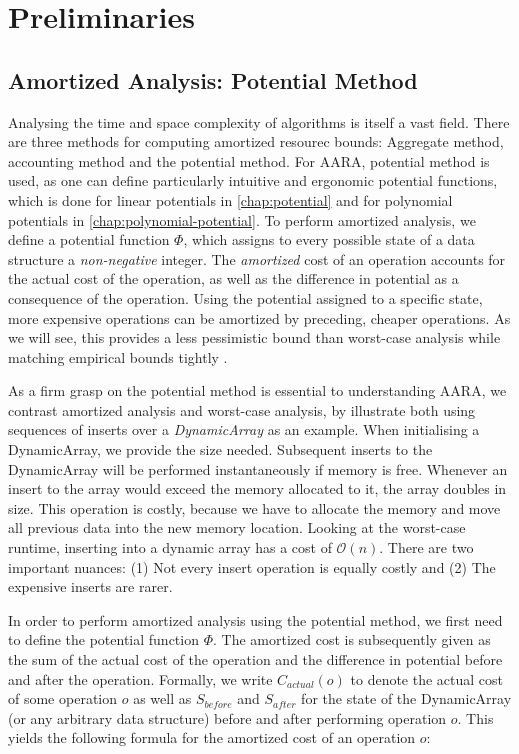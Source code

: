 \chapter{Preliminaries} \label{chap:preliminaries}

\section{Amortized Analysis: Potential Method}
Analysing the time and space complexity of algorithms is itself a vast field. There are three methods for computing amortized resourec bounds: Aggregate method, accounting method and the potential method. For AARA, potential method is used, as one can define particularly intuitive and ergonomic potential functions, which is done for linear potentials in \ref{chap:potential} and for polynomial potentials in \ref{chap:polynomial-potential}.
To perform amortized analysis, we define a potential function \(\Phi\), which assigns to every possible state of a data structure a \emph{non-negative} integer. The \emph{amortized} cost of an operation accounts for the actual cost of the operation, as well as the difference in potential as a consequence of the operation. Using the potential assigned to a specific state, more expensive operations can be amortized by preceding, cheaper operations. As we will see, this provides a less pessimistic bound than worst-case analysis while matching empirical bounds tightly . 

As a firm grasp on the potential method is essential to understanding AARA, we contrast amortized analysis and worst-case analysis, by illustrate both using sequences of inserts over a \emph{DynamicArray} as an example. 
When initialising a DynamicArray, we provide the size needed. Subsequent inserts to the DynamicArray will be performed instantaneously if memory is free. Whenever an insert to the array would exceed the memory allocated to it, the array doubles in size.
This operation is costly, because we have to allocate the memory and move all previous data into the new memory location. Looking at the worst-case runtime, inserting into a dynamic array has a cost of \(\mathcal{O}(n)\). There are two important nuances: (1) Not every insert operation is equally costly and (2) The expensive inserts are rarer.

In order to perform amortized analysis using the potential method, we first need to define the potential function \(\Phi\). The amortized cost is subsequently given as the sum of the actual cost of the operation and the difference in potential before and after the operation. Formally, we write \(C_{actual}(o)\) to denote the actual cost of some operation \(o\) as well as \(S_{before}\) and \(S_{after}\) for the state of the DynamicArray (or any arbitrary data structure) before and after performing operation \(o\). This yields the following formula for the amortized cost of an operation \(o\):


